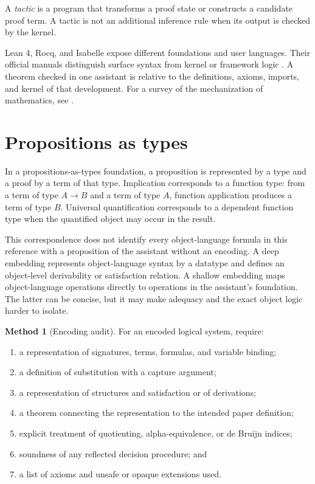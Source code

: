 \documentclass[11pt,oneside,openany]{book}
\theoremstyle{definition}
\newtheorem{definition}{Definition}[chapter]
\newtheorem{method}[definition]{Method}
\theoremstyle{plain}
\theoremstyle{remark}
\let\LogicDefinition\definition
\let\endLogicDefinition\enddefinition
\renewenvironment{definition}[1][]{%
  \LogicDefinition[#1]%
  \if\relax\detokenize{#1}\relax\else\index{#1}\fi
}{\endLogicDefinition}
\begin{document}
\begin{definition}[Tactic]
A \emph{tactic} is a program that transforms a proof state or constructs a
candidate proof term.  A tactic is not an additional inference rule when its
output is checked by the kernel.
\end{definition}

Lean 4, Rocq, and Isabelle expose different foundations and user languages.
Their official manuals distinguish surface syntax from kernel or framework
logic \cite{LeanManual2026,LeanTPIL,DeMouraUllrich2021,RocqManual2026,Isabelle2025}.
A theorem
checked in one assistant is relative to the definitions, axioms, imports, and
kernel of that development.  For a survey of the mechanization of
mathematics, see \cite{Avigad2018}.

\section{Propositions as types}
\label{sec:mechanization-02}

In a propositions-as-types foundation, a proposition is represented by a type
and a proof by a term of that type.  Implication corresponds to a function type:
from a term of type \(A\to B\) and a term of type \(A\), function application
produces a term of type \(B\).  Universal quantification corresponds to a
dependent function type when the quantified object may occur in the result.

This correspondence does not identify every object-language formula in this
reference with a proposition of the assistant without an encoding.  A deep
embedding represents object-language syntax by a datatype and defines an
object-level derivability or satisfaction relation.  A shallow embedding maps
object-language operations directly to operations in the assistant's
foundation.  The latter can be concise, but it may make adequacy and the exact
object logic harder to isolate.

\begin{method}[Encoding audit]
For an encoded logical system, require:
\begin{enumerate}
  \item a representation of signatures, terms, formulas, and variable binding;
  \item a definition of substitution with a capture argument;
  \item a representation of structures and satisfaction or of derivations;
  \item a theorem connecting the representation to the intended paper
        definition;
  \item explicit treatment of quotienting, alpha-equivalence, or de Bruijn
        indices;
  \item soundness of any reflected decision procedure; and
  \item a list of axioms and unsafe or opaque extensions used.
\end{enumerate}
\end{method}
\end{document}
